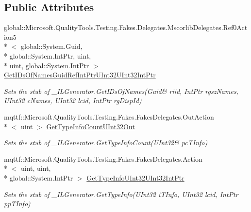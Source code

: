 \subsection*{Public Attributes}
\begin{DoxyCompactItemize}
\item 
global\-::\-Microsoft.\-Quality\-Tools.\-Testing.\-Fakes.\-Delegates.\-Mscorlib\-Delegates.\-Ref0\-Action5\\*
$<$ global\-::\-System.\-Guid, \\*
global\-::\-System.\-Int\-Ptr, uint, \\*
uint, global\-::\-System.\-Int\-Ptr $>$ \hyperlink{class_system_1_1_runtime_1_1_interop_services_1_1_fakes_1_1_stub___i_l_generator_a2e247533b0a7269be964d166da9e3778}{Get\-I\-Ds\-Of\-Names\-Guid\-Ref\-Int\-Ptr\-U\-Int32\-U\-Int32\-Int\-Ptr}
\begin{DoxyCompactList}\small\item\em Sets the stub of \-\_\-\-I\-L\-Generator.\-Get\-I\-Ds\-Of\-Names(Guid\& riid, Int\-Ptr rgsz\-Names, U\-Int32 c\-Names, U\-Int32 lcid, Int\-Ptr rg\-Disp\-Id)\end{DoxyCompactList}\item 
mqttf\-::\-Microsoft.\-Quality\-Tools.\-Testing.\-Fakes.\-Fakes\-Delegates.\-Out\-Action\\*
$<$ uint $>$ \hyperlink{class_system_1_1_runtime_1_1_interop_services_1_1_fakes_1_1_stub___i_l_generator_af17dc0aed649c1f712fbe4651404270f}{Get\-Type\-Info\-Count\-U\-Int32\-Out}
\begin{DoxyCompactList}\small\item\em Sets the stub of \-\_\-\-I\-L\-Generator.\-Get\-Type\-Info\-Count(U\-Int32\& pc\-T\-Info)\end{DoxyCompactList}\item 
mqttf\-::\-Microsoft.\-Quality\-Tools.\-Testing.\-Fakes.\-Fakes\-Delegates.\-Action\\*
$<$ uint, uint, \\*
global\-::\-System.\-Int\-Ptr $>$ \hyperlink{class_system_1_1_runtime_1_1_interop_services_1_1_fakes_1_1_stub___i_l_generator_a2b1821a23b76f8cf221aa27dea95c807}{Get\-Type\-Info\-U\-Int32\-U\-Int32\-Int\-Ptr}
\begin{DoxyCompactList}\small\item\em Sets the stub of \-\_\-\-I\-L\-Generator.\-Get\-Type\-Info(\-U\-Int32 i\-T\-Info, U\-Int32 lcid, Int\-Ptr pp\-T\-Info)\end{DoxyCompactList}\item 

\end{DoxyCompactItemize}
